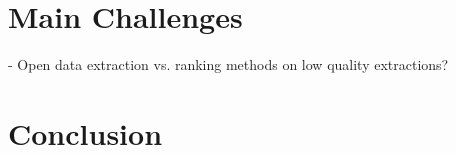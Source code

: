 \section{Main Challenges}
- Open data extraction vs. ranking methods on low quality extractions?

\section{Conclusion}
